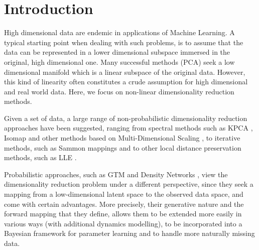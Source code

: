 \documentclass [10pt , a4paper]{article}
\begin{document}
\section{Introduction}
%
%
%
%
%
%
%

High dimensional data are endemic in applications of Machine Learning.
  A typical starting point when dealing with such problems,
 is to assume that the data can be represented in a lower dimensional subspace immersed in the original, high dimensional
 one. Many successful methods (\eg PCA) seek a low dimensional manifold which is a linear subspace of the 
original data. However, this kind of linearity often constitutes a crude assumption for high dimensional and real world 
data. Here, we focus on non-linear dimensionality reduction methods.


Given a set of data, a large
range of non-probabilistic dimensionality reduction approaches have been
suggested, ranging from spectral methods such as KPCA \cite{Scholkopf:kernelpca97}, Isomap \cite{Tenenbaum:isomap00}
and other methods based on Multi-Dimensional Scaling \cite{Mardia:multivariate79}, to  iterative methods, such as Sammon mappings
\cite{Sammon:nonlinear69} and to other local distance preservation methods, such as LLE \cite{Roweis:lle00}.

Probabilistic approaches, such as GTM \cite{Bishop:gtm_ncomp98} and Density Networks \cite{MacKay:wondsa95}, view the dimensionality
reduction problem under a different perspective, since they seek a mapping from a low-dimensional latent space
to the observed data space, and come with certain advantages. More precisely, their generative nature and the forward mapping
that they define, allows them to be 
extended more easily in various ways (\eg with additional dynamics modelling), to be incorporated into a Bayesian 
framework for parameter learning and to handle more naturally missing data.
\end{document}
